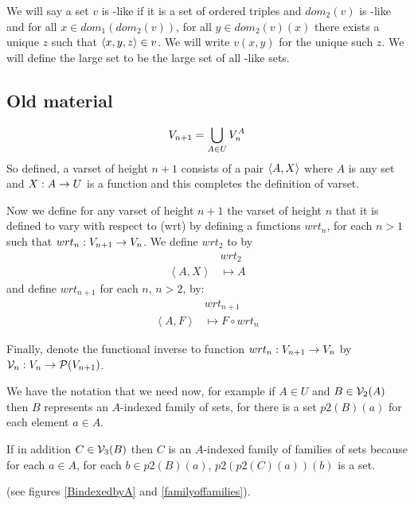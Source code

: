 \documentclass[10pt,a4paper]{scrartcl}
\begin{document}
\noindent
We will say a set $v$ is \varset[3]-like if it is a set of ordered triples and 
$dom_2(v)$ is \varset[2]-like and for all $x \in dom_1(dom_2(v))$, for all $y \in dom_2(v)(x)$ 
there exists a unique $z$ such that $\tuple{x,y,z} \in v$. We will write $v(x,y)$ for the
unique such $z$. We will define the large set \varset[3] to be the large set of  all \varset[3]-like sets.

\noindent 

\subsection{Old material}
\begin{equation*}
\varset[n+1]=\bigcup_{A \in U}{\varset[n]^A}
\end{equation*}
So defined, a varset of height $n+1$ consists of a pair $\tuple{A,X}$ where
$A$ is any set and $X:A \morph U$ is a function and this completes the definition of varset.

\noindent
Now we define for any varset of height $n+1$ the varset of height $n$ that it is defined to vary with respect to (wrt) by defining a functions $wrt_n$, for each $n >1$ such that $wrt_n: \varset[n+1] \morph \varset[n]$. 
We define $wrt_2$ to by
\begin{align*}
  &wrt_{2}                                               \\
\left\langle A,X\right\rangle &\longmapsto A
\end{align*}
\noindent
and define   $wrt_{n+1}$ for each $n$, $n > 2$, by:
\begin{align*}
  &wrt_{n+1}                 \\
\left\langle A,F\right\rangle &\longmapsto F \circ wrt_n
\end{align*}


Finally, denote the functional inverse to 
function $wrt_n: \varset[n+1] \morph \varset[n]$ by $\localvarsets_n :
\varset[n] \morph \powerset(\varset[n+1])$. 

We have the notation that we need now, for example if $A \in U$ and $B \in \localvarsets_2(A)$ then $B$ represents an $A$-indexed family of sets, for there is a set $p2(B)(a)$ for each element $a \in A$.

If in addition $C \in \localvarsets_3(B)$ then $C$ is  an $A$-indexed family of families of sets because for each $a \in A$,
for each $b \in p2(B)(a)$,
$p2(p2(C)(a))(b)$ is a set.

(see figures  \ref{BindexedbyA} and \ref{familyoffamilies}).
 
\end{document}
